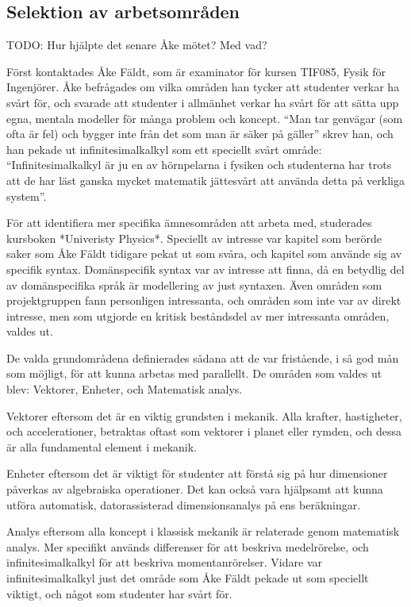 \begin{binge}
\section{Selektion av arbetsområden}

TODO: Hur hjälpte det senare Åke mötet? Med vad?

\begin{draft}
  Först kontaktades Åke Fäldt, som är examinator för kursen TIF085,
  Fysik för Ingenjörer. Åke befrågades om vilka områden han tycker att
  studenter verkar ha svårt för, och svarade att studenter i allmänhet
  verkar ha svårt för att sätta upp egna, mentala modeller för många
  problem och koncept. ``Man tar genvägar (som ofta är fel) och bygger
  inte från det som man är säker på gäller'' skrev han, och han pekade
  ut infinitesimalkalkyl som ett speciellt svårt område:
  ``Infinitesimalkalkyl är ju en av hörnpelarna i fysiken och
  studenterna har trots att de har läst ganska mycket matematik
  jättesvårt att använda detta på verkliga system''.

  För att identifiera mer specifika ämnesområden att arbeta med,
  studerades kursboken *Univeristy Physics*. Speciellt av intresse var
  kapitel som berörde saker som Åke Fäldt tidigare pekat ut som svåra,
  och kapitel som använde sig av specifik syntax. Domänspecifik syntax
  var av intresse att finna, då en betydlig del av domänspecifika språk
  är modellering av just syntaxen. Även områden som projektgruppen fann
  personligen intressanta, och områden som inte var av direkt intresse,
  men som utgjorde en kritisk beståndsdel av mer intressanta områden,
  valdes ut.

  De valda grundområdena definierades sådana att de var fristående, i
  så god mån som möjligt, för att kunna arbetas med parallellt. De
  områden som valdes ut blev: Vektorer, Enheter, och Matematisk
  analys.

  Vektorer eftersom det är en viktig grundsten i mekanik. Alla krafter,
  hastigheter, och accelerationer, betraktas oftast som vektorer i
  planet eller rymden, och dessa är alla fundamental element i
  mekanik.

  Enheter eftersom det är viktigt för studenter att förstå sig på hur
  dimensioner påverkas av algebraiska operationer. Det kan också vara
  hjälpsamt att kunna utföra automatisk, datorassisterad
  dimensionsanalys på ens beräkningar.

  Analys eftersom alla koncept i klassisk mekanik är relaterade genom
  matematisk analys. Mer specifikt används differenser för att beskriva
  medelrörelse, och infinitesimalkalkyl för att beskriva
  momentanrörelser. Vidare var infinitesimalkalkyl just det område som
  Åke Fäldt pekade ut som speciellt viktigt, och något som studenter har
  svårt för.


\end{draft}
\end{binge}
